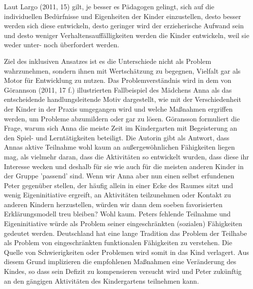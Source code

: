 Laut Largo (2011, 15) gilt, je besser es Pädagogen gelingt, sich auf die individuellen Bedürfnisse und Eigenheiten der Kinder einzustellen, desto besser werden sich diese entwickeln, desto geringer wird der erzieherische Aufwand sein und desto weniger Verhaltensauffälligkeiten werden die Kinder entwickeln, weil sie weder unter- noch überfordert werden.   

Ziel des inklusiven Ansatzes ist es die Unterschiede nicht als Problem wahrzunehmen, sondern ihnen mit Wertschätzung zu begegnen, Vielfalt gar als Motor für Entwicklung zu nutzen. Das Problemverständnis wird in dem von Görannson (2011, 17 f.) illustrierten Fallbeispiel des Mädchens Anna als das entscheidende handlungsleitende Motiv dargestellt, wie mit der Verschiedenheit der Kinder in der Praxis umgegangen wird und welche Maßnahmen ergriffen werden, um Probleme abzumildern oder gar zu lösen. Göransson formuliert die Frage, warum sich Anna die meiste Zeit im Kindergarten mit Begeisterung an den Spiel- und Lerntätigkeiten beteiligt. Die Autorin gibt als Antwort, dass Annas aktive Teilnahme wohl kaum an außergewöhnlichen Fähigkeiten liegen mag, als vielmehr daran, dass die Aktivitäten so entwickelt wurden, dass diese ihr Interesse wecken und deshalb für sie wie auch für die meisten anderen Kinder in der Gruppe 'passend' sind. Wenn wir Anna aber nun einen selbst erfundenen Peter gegenüber stellen, der häufig allein in einer Ecke des Raumes sitzt und wenig Eigeninitiative ergreift, an Aktivitäten teilzunehmen oder Kontakt zu anderen Kindern herzustellen, würden wir dann dem soeben favorisierten Erklärungsmodell treu bleiben? Wohl kaum. Peters fehlende Teilnahme und Eigeninitiative würde als Problem seiner eingeschränkten (sozialen) Fähigkeiten gedeutet werden. Deutschland hat eine lange Tradition das Problem der Teilhabe als Problem von eingeschränkten funktionalen Fähigkeiten zu verstehen. Die Quelle von Schwierigkeiten oder Problemen wird somit in das Kind verlagert. Aus diesem Grund implizieren die empfohlenen Maßnahmen eine Veränderung des Kindes, so dass sein Defizit zu kompensieren versucht wird und Peter zukünftig an den gängigen Aktivitäten des Kindergartens teilnehmen kann. 

